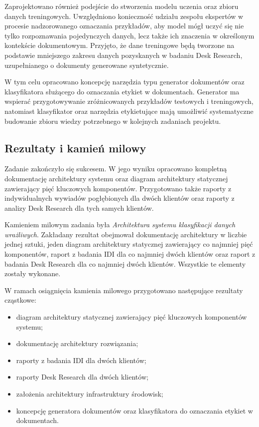 \documentclass[12pt,a4paper]{report}
\begin{document}
Zaprojektowano również podejście do stworzenia modelu uczenia oraz zbioru danych treningowych. Uwzględniono konieczność udziału zespołu ekspertów w procesie nadzorowanego oznaczania przykładów, aby model mógł uczyć się nie tylko rozpoznawania pojedynczych danych, lecz także ich znaczenia w określonym kontekście dokumentowym. Przyjęto, że dane treningowe będą tworzone na podstawie mniejszego zakresu danych pozyskanych w badaniu Desk Research, uzupełnianego o dokumenty generowane syntetycznie.

W tym celu opracowano koncepcję narzędzia typu generator dokumentów oraz klasyfikatora służącego do oznaczania etykiet w dokumentach. Generator ma wspierać przygotowywanie zróżnicowanych przykładów testowych i treningowych, natomiast klasyfikator oraz narzędzia etykietujące mają umożliwić systematyczne budowanie zbioru wiedzy potrzebnego w kolejnych zadaniach projektu.

\subsection{Rezultaty i kamień milowy}
Zadanie zakończyło się sukcesem. W jego wyniku opracowano kompletną dokumentację architektury systemu oraz diagram architektury statycznej zawierający pięć kluczowych komponentów. Przygotowano także raporty z indywidualnych wywiadów pogłębionych dla dwóch klientów oraz raporty z analizy Desk Research dla tych samych klientów.

Kamieniem milowym zadania była \textit{Architektura systemu klasyfikacji danych wrażliwych}. Zakładany rezultat obejmował dokumentację architektury w liczbie jednej sztuki, jeden diagram architektury statycznej zawierający co najmniej pięć komponentów, raport z badania IDI dla co najmniej dwóch klientów oraz raport z badania Desk Research dla co najmniej dwóch klientów. Wszystkie te elementy zostały wykonane.

W ramach osiągnięcia kamienia milowego przygotowano następujące rezultaty cząstkowe:

\begin{itemize}
    \item diagram architektury statycznej zawierający pięć kluczowych komponentów systemu;
    \item dokumentację architektury rozwiązania;
    \item raporty z badania IDI dla dwóch klientów;
    \item raporty Desk Research dla dwóch klientów;
    \item założenia architektury infrastruktury środowisk;
    \item koncepcję generatora dokumentów oraz klasyfikatora do oznaczania etykiet w dokumentach.
\end{itemize}
\end{document}
